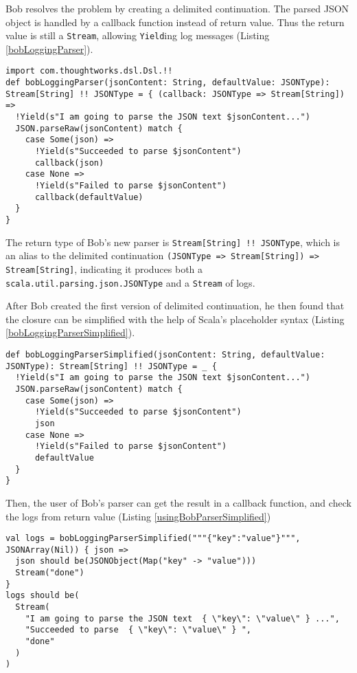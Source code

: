 Bob resolves the problem by creating a delimited continuation. The parsed JSON object is handled by a callback function instead of return value. Thus the return value is still a \lstinline{Stream}, allowing \lstinline{Yield}ing log messages (Listing \ref{bobLoggingParser}).

\begin{lstlisting}[float={h t b p},caption={The implementation of Bob's logging parser},label={bobLoggingParser}]
import com.thoughtworks.dsl.Dsl.!!
def bobLoggingParser(jsonContent: String, defaultValue: JSONType): Stream[String] !! JSONType = { (callback: JSONType => Stream[String]) =>
  !Yield(s"I am going to parse the JSON text $jsonContent...")
  JSON.parseRaw(jsonContent) match {
    case Some(json) =>
      !Yield(s"Succeeded to parse $jsonContent")
      callback(json)
    case None =>
      !Yield(s"Failed to parse $jsonContent")
      callback(defaultValue)
  }
}
\end{lstlisting}

The return type of Bob's new parser is \lstinline{Stream[String] !! JSONType}, which is an alias to the delimited continuation \lstinline{(JSONType => Stream[String]) => Stream[String]}, indicating it produces both a \lstinline{scala.util.parsing.json.JSONType} and a \lstinline{Stream} of logs.

After Bob created the first version of delimited continuation, he then found that the closure can be simplified with the help of Scala's placeholder syntax (Listing \ref{bobLoggingParserSimplified}).

\begin{lstlisting}[float={h t b p},caption={The implementation of Bob's logging parser, the simplified version},label={bobLoggingParserSimplified}]
def bobLoggingParserSimplified(jsonContent: String, defaultValue: JSONType): Stream[String] !! JSONType = _ {
  !Yield(s"I am going to parse the JSON text $jsonContent...")
  JSON.parseRaw(jsonContent) match {
    case Some(json) =>
      !Yield(s"Succeeded to parse $jsonContent")
      json
    case None =>
      !Yield(s"Failed to parse $jsonContent")
      defaultValue
  }
}
\end{lstlisting}

Then, the user of Bob's parser can get the result in a callback function, and check the logs from return value (Listing \ref{usingBobParserSimplified})

\begin{lstlisting}[float={h t b p},caption={Using Bob's parser},label={usingBobParserSimplified}]
val logs = bobLoggingParserSimplified("""{"key":"value"}""", JSONArray(Nil)) { json =>
  json should be(JSONObject(Map("key" -> "value")))
  Stream("done")
}
logs should be(
  Stream(
    "I am going to parse the JSON text  { \"key\": \"value\" } ...",
    "Succeeded to parse  { \"key\": \"value\" } ",
    "done"
  )
)
\end{lstlisting}

